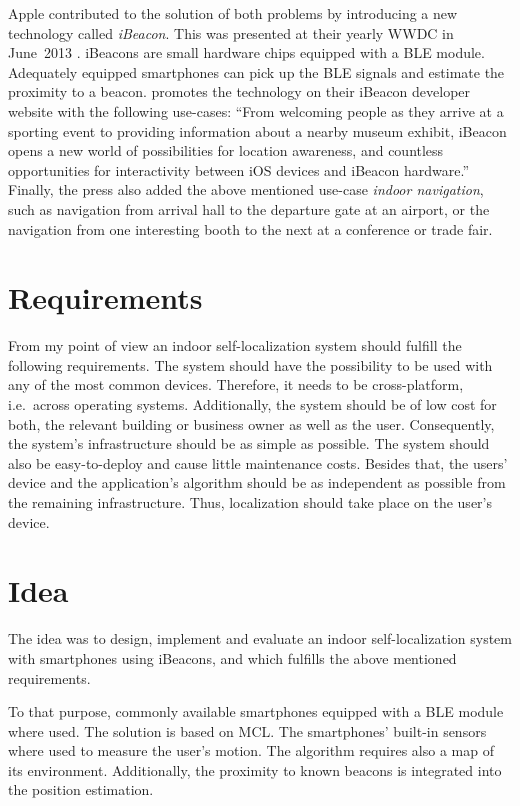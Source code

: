 Apple contributed to the solution of both problems by introducing a new technology called \emph{iBeacon}. This was presented at their yearly \ac{WWDC} in June~2013 \citep{apple:wwdc_2013_bruins}. iBeacons are small hardware chips equipped with a \ac{BLE} module. Adequately equipped smartphones can pick up the \ac{BLE} signals and estimate the proximity to a beacon. \citet{apple:ibeacon_site} promotes the technology on their iBeacon developer website with the following use-cases: ``From welcoming people as they arrive at a sporting event to providing information about a nearby museum exhibit, iBeacon opens a new world of possibilities for location awareness, and countless opportunities for interactivity between iOS devices and iBeacon hardware.'' Finally, the press also added the above mentioned use-case \emph{indoor navigation}, such as navigation from arrival hall to the departure gate at an airport, or the navigation from one interesting booth to the next at a conference or trade fair.


\section{Requirements}
From my point of view an indoor self-localization system should fulfill the following requirements. The system should have the possibility to be used with any of the most common devices. Therefore, it needs to be cross-platform, i.e.\ across operating systems. Additionally, the system should be of low cost for both, the relevant building or business owner as well as the user. Consequently, the system’s infrastructure should be as simple as possible. The system should also be easy-to-deploy and cause little maintenance costs. Besides that, the users’ device and the application's algorithm should be as independent as possible from the remaining infrastructure. Thus, localization should take place on the user’s device.


\section{Idea} %
The idea was to design, implement and evaluate an indoor self-localization system with smartphones using iBeacons, and which fulfills the above mentioned requirements.

To that purpose, commonly available smartphones equipped with a \acs{BLE} module where used. The solution is based on \ac{MCL}. The smartphones' built-in sensors where used to measure the user's motion. The algorithm requires also a map of its environment. Additionally, the proximity to known beacons is integrated into the position estimation.

